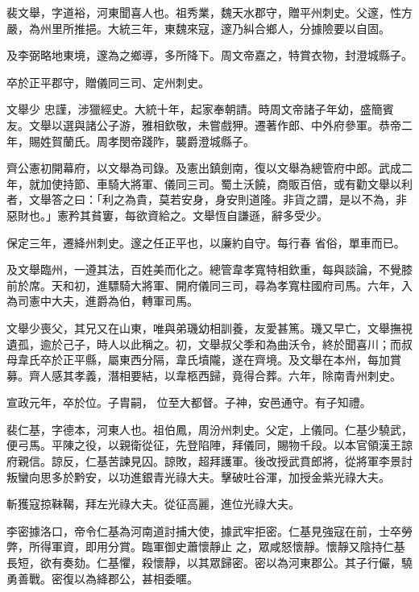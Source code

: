 \begin{pinyinscope}
 裴文舉，字道裕，河東聞喜人也。祖秀業，魏天水郡守，贈平州刺史。父邃，性方嚴，為州里所推挹。大統三年，東魏來寇，邃乃糾合鄉人，分據險要以自固。



 及李弼略地東境，邃為之鄉導，多所降下。周文帝嘉之，特賞衣物，封澄城縣子。



 卒於正平郡守，贈儀同三司、定州刺史。



 文舉少
 忠謹，涉獵經史。大統十年，起家奉朝請。時周文帝諸子年幼，盛簡賓友。文舉以選與諸公子游，雅相欽敬，未嘗戲狎。遷著作郎、中外府參軍。恭帝二年，賜姓賀蘭氏。周孝閔帝踐阼，襲爵澄城縣子。



 齊公憲初開幕府，以文舉為司錄。及憲出鎮劍南，復以文舉為總管府中郎。武成二年，就加使持節、車騎大將軍、儀同三司。蜀土沃饒，商販百倍，或有勸文舉以利者，文舉答之曰：「利之為貴，莫若安身，身安則道隆。非貨之謂，是以不為，非惡財也。」憲矜其貧窶，每欲資給之。文舉恆自謙遜，辭多受少。



 保定三年，遷絳州刺史。邃之任正平也，以廉約自守。每行春
 省俗，單車而已。



 及文舉臨州，一遵其法，百姓美而化之。總管韋孝寬特相欽重，每與談論，不覺膝前於席。天和初，進驃騎大將軍、開府儀同三司，尋為孝寬柱國府司馬。六年，入為司憲中大夫，進爵為伯，轉軍司馬。



 文舉少喪父，其兄又在山東，唯與弟璣幼相訓養，友愛甚篤。璣又早亡，文舉撫視遺孤，逾於己子，時人以此稱之。初，文舉叔父季和為曲沃令，終於聞喜川；而叔母韋氏卒於正平縣，屬東西分隔，韋氏墳隴，遂在齊境。及文舉在本州，每加賞募。齊人感其孝義，潛相要結，以韋柩西歸，竟得合葬。六年，除南青州刺史。



 宣政元年，卒於位。子胄嗣，
 位至大都督。子神，安邑通守。有子知禮。



 裴仁基，字德本，河東人也。祖伯鳳，周汾州刺史。父定，上儀同。仁基少驍武，便弓馬。平陳之役，以親衛從征，先登陷陣，拜儀同，賜物千段。以本官領漢王諒府親信。諒反，仁基苦諫見囚。諒敗，超拜護軍。後改授武賁郎將，從將軍李景討叛蠻向思多於黔安，以功進銀青光祿大夫。擊破吐谷渾，加授金紫光祿大夫。



 斬獲寇掠靺鞨，拜左光祿大夫。從征高麗，進位光祿大夫。



 李密據洛口，帝令仁基為河南道討捕大使，據武牢拒密。仁基見強寇在前，士卒勞弊，所得軍資，即用分賞。臨軍御史蕭懷靜止
 之，眾咸怒懷靜。懷靜又陰持仁基長短，欲有奏劾。仁基懼，殺懷靜，以其眾歸密。密以為河東郡公。其子行儼，驍勇善戰。密復以為絳郡公，甚相委暱。




\end{pinyinscope}

